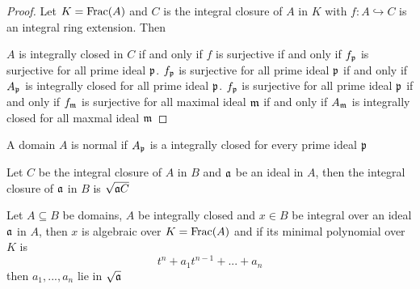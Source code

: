 \begin{proof}
	Let $K = \operatorname{Frac}(A)$ and $C$ is the integral closure of $A$ in $K$ with $f: A \hookrightarrow C$ is an integral ring extension. Then
	
	$A$ is integrally closed in $C$ if and only if $f$ is surjective if and only if $f_{\mathfrak{p}}$ is surjective for all prime ideal $\mathfrak{p}$. $f_{\mathfrak{p}}$ is surjective for all prime ideal $\mathfrak{p}$ if and only if $A_{\mathfrak{p}}$ is integrally closed for all prime ideal $\mathfrak{p}$. $f_{\mathfrak{p}}$ is surjective for all prime ideal $\mathfrak{p}$ if and only if $f_{\mathfrak{m}}$ is surjective for all maximal ideal $\mathfrak{m}$ if and only if $A_{\mathfrak{m}}$ is integrally closed for all maxmal ideal $\mathfrak{m}$
\end{proof}

\begin{definition}
	A domain $A$ is normal if $A_{\mathfrak{p}}$ is a integrally closed for every prime ideal $\mathfrak{p}$
\end{definition}

\begin{lemma}
	Let $C$ be the integral closure of $A$ in $B$ and $\mathfrak{a}$ be an ideal in $A$, then the integral closure of $\mathfrak{a}$ in $B$ is $\sqrt{\mathfrak{a} C}$
\end{lemma}

\begin{proposition}
	Let $A \subseteq B$ be domains, $A$ be integrally closed and $x \in B$ be integral over an ideal $\mathfrak{a}$ in $A$, then $x$ is algebraic over $K = \operatorname{Frac}(A)$ and if its minimal polynomial over $K$ is
	$$
		t^n + a_1 t^{n-1} + ... + a_n
	$$
	then $a_1, ..., a_n$ lie in $\sqrt{\mathfrak{a}}$
\end{proposition}

